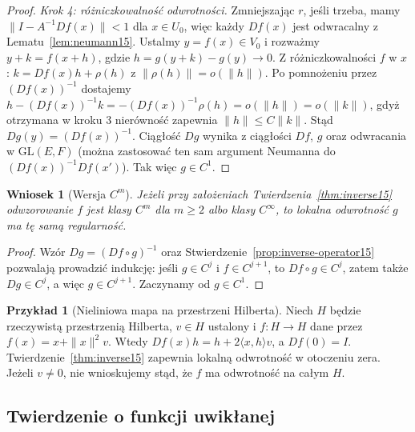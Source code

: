\documentclass[11pt,a4paper]{article}
\numberwithin{equation}{section}
\theoremstyle{plain}
\newtheorem{wniosek}[twierdzenie]{Wniosek}
\theoremstyle{definition}
\newtheorem{przyklad}[twierdzenie]{Przykład}
\theoremstyle{remark}
\begin{document}
\begin{proof}
\emph{Krok 4: różniczkowalność odwrotności.} Zmniejszając $r$, jeśli trzeba, mamy $\|I-A^{-1}Df(x)\|<1$ dla $x\in U_0$, więc każdy $Df(x)$ jest odwracalny z Lematu~\ref{lem:neumann15}. Ustalmy $y=f(x)\in V_0$ i rozważmy $y+k=f(x+h)$, gdzie $h=g(y+k)-g(y)\to0$. Z różniczkowalności $f$ w $x$:
$k=Df(x)h+\rho(h)$ z $\|\rho(h)\|=o(\|h\|)$. Po pomnożeniu przez $(Df(x))^{-1}$ dostajemy
$h-(Df(x))^{-1}k=-(Df(x))^{-1}\rho(h)=o(\|h\|)=o(\|k\|)$,
gdyż otrzymana w kroku 3 nierówność zapewnia $\|h\|\le C\|k\|$. Stąd $Dg(y)=(Df(x))^{-1}$. Ciągłość $Dg$ wynika z ciągłości $Df$, $g$ oraz odwracania w $\mathrm{GL}(E,F)$ (można zastosować ten sam argument Neumanna do $(Df(x))^{-1}Df(x')$). Tak więc $g\in C^1$.
\end{proof}

\begin{wniosek}[Wersja $C^m$]
\label{cor:inverse-ck15}
Jeżeli przy założeniach Twierdzenia~\ref{thm:inverse15} odwzorowanie $f$ jest klasy $C^m$ dla $m\ge2$ albo klasy $C^\infty$, to lokalna odwrotność $g$ ma tę samą regularność.
\end{wniosek}
\begin{proof}
Wzór $Dg=(Df\circ g)^{-1}$ oraz Stwierdzenie~\ref{prop:inverse-operator15} pozwalają prowadzić indukcję: jeśli $g\in C^j$ i $f\in C^{j+1}$, to $Df\circ g\in C^j$, zatem także $Dg\in C^j$, a więc $g\in C^{j+1}$. Zaczynamy od $g\in C^1$.
\end{proof}

\begin{przyklad}[Nieliniowa mapa na przestrzeni Hilberta]
\label{ex:inverse-hilbert15}
Niech $H$ będzie rzeczywistą przestrzenią Hilberta, $v\in H$ ustalony i $f:H\to H$ dane przez $f(x)=x+\|x\|^2v$. Wtedy $Df(x)h=h+2\langle x,h\rangle v$, a $Df(0)=I$. Twierdzenie~\ref{thm:inverse15} zapewnia lokalną odwrotność w otoczeniu zera. Jeżeli $v\ne0$, nie wnioskujemy stąd, że $f$ ma odwrotność na całym $H$.
\end{przyklad}

\subsection{Twierdzenie o funkcji uwikłanej}
\end{document}
